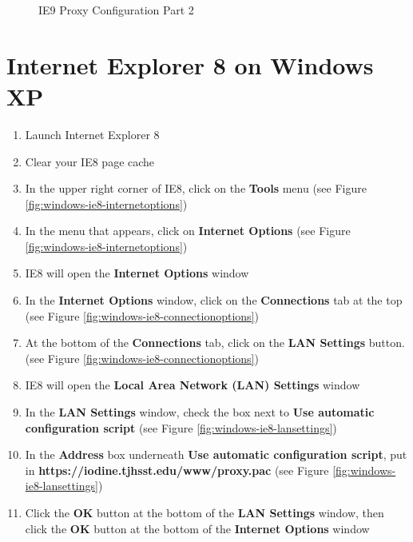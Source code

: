 \documentclass{article}
\newcommand{\proxypacurl}{https://iodine.tjhsst.edu/www/proxy.pac}
\begin{document}
\begin{flushleft}
\begin{figure}[H]
\caption{IE9 Proxy Configuration Part 2}
\end{figure}
\section{Internet Explorer 8 on Windows XP}
\begin{enumerate}
\item Launch Internet Explorer 8
\item Clear your IE8 page cache
\item In the upper right corner of IE8, click on the \textbf{Tools} menu (see Figure \ref{fig:windows-ie8-internetoptions})
\item In the menu that appears, click on \textbf{Internet Options} (see Figure \ref{fig:windows-ie8-internetoptions})
\item IE8 will open the \textbf{Internet Options} window
\item In the \textbf{Internet Options} window, click on the \textbf{Connections} tab at the top (see Figure \ref{fig:windows-ie8-connectionoptions})
\item At the bottom of the \textbf{Connections} tab, click on the \textbf{LAN Settings} button. (see Figure \ref{fig:windows-ie8-connectionoptions})
\item IE8 will open the \textbf{Local Area Network (LAN) Settings} window
\item In the \textbf{LAN Settings} window, check the box next to \textbf{Use automatic configuration script} (see Figure \ref{fig:windows-ie8-lansettings})
\item In the \textbf{Address} box underneath \textbf{Use automatic configuration script}, put in \linebreak\textbf{\proxypacurl} (see Figure \ref{fig:windows-ie8-lansettings})
\item Click the \textbf{OK} button at the bottom of the \textbf{LAN Settings} window, then click the \textbf{OK} button at the bottom of the \textbf{Internet Options} window

\end{enumerate}
\end{flushleft}
\end{document}
